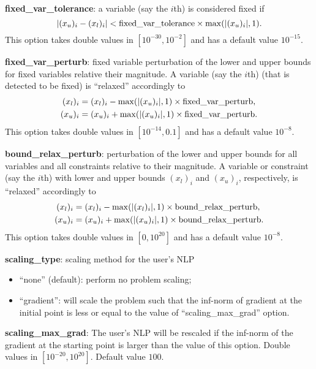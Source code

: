 \documentclass[11pt]{article}
\begin{document}
\medskip

\noindent \textbf{fixed\_var\_tolerance}: a variable (say the $i$th) is considered fixed if 
\begin{displaymath}
|(x_u)_i-(x_l)_i| < \textnormal{fixed\_var\_tolerance} \times \max(|(x_u)_i|,1).
\end{displaymath}
This option takes double values in $[10^{-30}, 10^{-2}]$ and has a default value $10^{-15}$.

\medskip

\noindent \textbf{fixed\_var\_perturb}: fixed variable perturbation of the lower and upper bounds for fixed variables relative their  magnitude. A variable (say the $i$th) (that is detected to be fixed) is ``relaxed'' accordingly to 
\begin{align*}
(x_l)_i & =  (x_l)_i -  \max(|(x_u)_i|,1) \times \textnormal{fixed\_var\_perturb}, \\
(x_u)_i & =  (x_u)_i +  \max(|(x_u)_i|,1) \times \textnormal{fixed\_var\_perturb}.
\end{align*}
This option takes double values in $[10^{-14}, 0.1]$ and has a default value $10^{-8}$.


\noindent \textbf{bound\_relax\_perturb}: perturbation of the lower and upper bounds for all variables and all constraints relative to their magnitude. A variable or constraint (say the $i$th) with lower and upper bounds $(x_l)_i$ and $(x_u)_i$, respectively,  is ``relaxed'' accordingly to 
\begin{align*}
(x_l)_i & =  (x_l)_i -  \max(|(x_l)_i|,1) \times \textnormal{bound\_relax\_perturb}, \\
(x_u)_i & =  (x_u)_i +  \max(|(x_u)_i|,1) \times \textnormal{bound\_relax\_perturb}.
\end{align*}
This option takes double values in $[0, 10^{20}]$ and has a default value $10^{-8}$.


\noindent \textbf{scaling\_type}: scaling method for the user's NLP
\begin{itemize}
\item ``none'' (default): perform no problem scaling;
\item ``gradient'':  will scale the problem such that the inf-norm of gradient at the initial point is less or equal to the value of ``scaling\_max\_grad'' option.
\end{itemize}

\medskip

\noindent \textbf{scaling\_max\_grad}: The user's NLP will be rescaled if the inf-norm of the gradient at the starting point is larger than the value of this option. Double values in $[10^{-20}, 10^{20}]$. Default value $100$.
\end{document}
